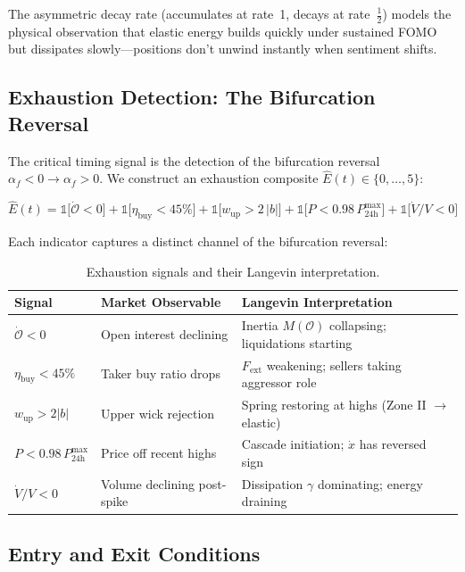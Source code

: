\documentclass[11pt,a4paper]{article}
\newcommand{\af}{\alpha_f}
\newcommand{\Fext}{F_{\mathrm{ext}}}
\newcommand{\OI}{\mathcal{O}}
\begin{document}
The asymmetric decay rate (accumulates at rate~1, decays at rate~$\tfrac{1}{2}$) 
models the physical observation that elastic energy builds quickly under 
sustained FOMO but dissipates slowly---positions don't unwind instantly when 
sentiment shifts.


\subsection{Exhaustion Detection: The Bifurcation Reversal}

The critical timing signal is the detection of the bifurcation reversal 
$\af < 0 \to \af > 0$. We construct an exhaustion composite 
$\hat{E}(t) \in \{0,\ldots,5\}$:

\begin{equation}
\label{eq:exhaustion}
\hat{E}(t) = \mathbb{1}\bigl[\dot{\OI} < 0\bigr] 
+ \mathbb{1}\bigl[\eta_{\mathrm{buy}} < 45\%\bigr]
+ \mathbb{1}\bigl[w_{\mathrm{up}} > 2\,|b|\bigr]
+ \mathbb{1}\bigl[P < 0.98\,P_{24\text{h}}^{\max}\bigr]
+ \mathbb{1}\bigl[\dot{V}/V < 0\bigr]
\end{equation}

Each indicator captures a distinct channel of the bifurcation reversal:

\begin{table}[H]
\centering
\caption{Exhaustion signals and their Langevin interpretation.}
\label{tab:exhaustion}
\renewcommand{\arraystretch}{1.3}
\begin{tabularx}{\textwidth}{lXX}
\toprule
Signal & Market Observable & Langevin Interpretation \\
\midrule
$\dot{\OI} < 0$ & Open interest declining & 
    Inertia $M(\OI)$ collapsing; liquidations starting \\
$\eta_{\mathrm{buy}} < 45\%$ & Taker buy ratio drops & 
    $\Fext$ weakening; sellers taking aggressor role \\
$w_{\mathrm{up}} > 2|b|$ & Upper wick rejection & 
    Spring restoring at highs (Zone II $\to$ elastic) \\
$P < 0.98\,P^{\max}_{24\text{h}}$ & Price off recent highs & 
    Cascade initiation; $\dot{x}$ has reversed sign \\
$\dot{V}/V < 0$ & Volume declining post-spike & 
    Dissipation $\gamma$ dominating; energy draining \\
\bottomrule
\end{tabularx}
\end{table}


\subsection{Entry and Exit Conditions}
\end{document}
